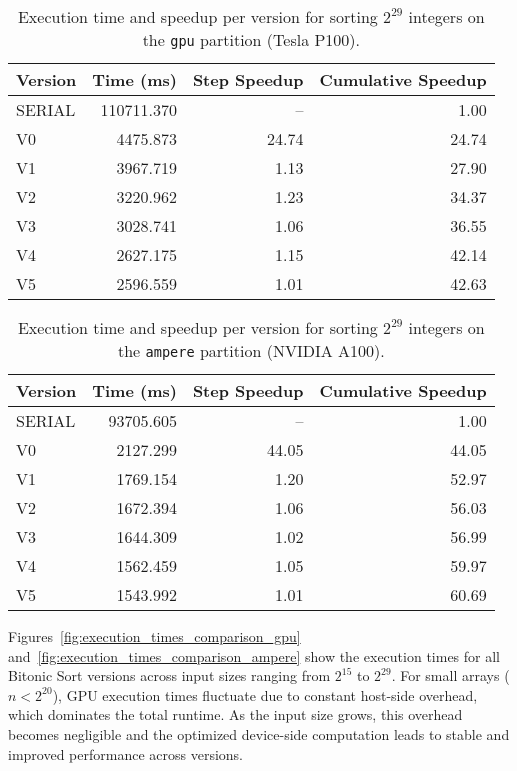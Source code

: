 \documentclass{article}
\begin{document}
\begin{table}[H]
\centering
\begin{tabular}{|l|r|r|r|}
\hline
\textbf{Version} & \textbf{Time (ms)} & \textbf{Step Speedup} & \textbf{Cumulative Speedup} \\
\hline
SERIAL & 110711.370 & --   & 1.00 \\
V0     & 4475.873   & 24.74 & 24.74 \\
V1     & 3967.719   & 1.13  & 27.90 \\
V2     & 3220.962   & 1.23  & 34.37 \\
V3     & 3028.741   & 1.06  & 36.55 \\
V4     & 2627.175   & 1.15  & 42.14 \\
V5     & 2596.559   & 1.01  & 42.63 \\
\hline
\end{tabular}
\caption{Execution time and speedup per version for sorting $2^{29}$ integers on the \texttt{gpu} 
partition (Tesla P100).}
\label{tab:speedup_vs_version_gpu}
\end{table}

\begin{table}[H]
\centering
\begin{tabular}{|l|r|r|r|}
\hline
\textbf{Version} & \textbf{Time (ms)} & \textbf{Step Speedup} & \textbf{Cumulative Speedup} \\
\hline
SERIAL & 93705.605 & --   & 1.00 \\
V0     & 2127.299   & 44.05 & 44.05 \\
V1     & 1769.154   & 1.20  & 52.97 \\
V2     & 1672.394   & 1.06  & 56.03 \\
V3     & 1644.309   & 1.02  & 56.99 \\
V4     & 1562.459   & 1.05  & 59.97 \\
V5     & 1543.992   & 1.01  & 60.69 \\
\hline
\end{tabular}
\caption{Execution time and speedup per version for sorting $2^{29}$ integers on the \texttt{ampere} 
partition (NVIDIA A100).}
\label{tab:speedup_vs_version_ampere}
\end{table}

Figures~\ref{fig:execution_times_comparison_gpu} and~\ref{fig:execution_times_comparison_ampere} show the 
execution times for all Bitonic Sort versions across input sizes ranging from $2^{15}$ to $2^{29}$. For 
small arrays ($n < 2^{20}$), GPU execution times fluctuate due to constant host-side overhead, which 
dominates the total runtime. As the input size grows, this overhead becomes negligible and the optimized 
device-side computation leads to stable and improved performance across versions.
\end{document}
